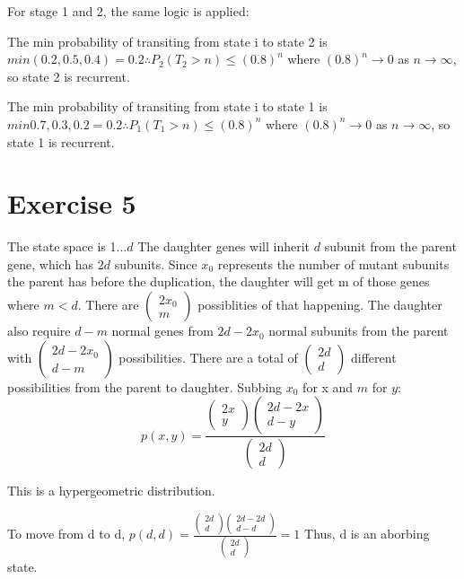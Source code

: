 \documentclass{article}\usepackage[]{graphicx}\usepackage[]{color}
\begin{document}
For stage 1 and 2, the same logic is applied:

The min probability of transiting from state i to state 2 is $min(0.2, 0.5,0.4)=0.2\therefore P_{2}(T_{2}>n)\leq (0.8)^{n}$ where
$(0.8)^{n} \rightarrow 0$ as $n \rightarrow \infty$, so state 2 is recurrent.

The min probability of transiting from state i to state 1 is $min{0.7, 0.3,0.2}=0.2\therefore P_{1}(T_{1}>n)\leq (0.8)^{n}$ where
$(0.8)^{n} \rightarrow 0$ as $n \rightarrow \infty$, so state 1 is recurrent.

\section*{Exercise 5}
The state space is {1...$d$}
The daughter genes will inherit $d$ subunit from the parent gene, which has $2d$ subunits. Since $x_{0}$ represents the number of mutant subunits the parent has before the duplication, the daughter will get m of those genes where $m<d$. There are $\left(\begin{array}{c}
2x_{0}\\
m
\end{array}\right)$ possiblities of that happening. The daughter also require $d-m$ normal genes from $2d-2x_{0}$ normal subunits from the parent with $\left(\begin{array}{c}
2d-2x_{0}\\
d-m
\end{array}\right)$ possibilities. There are a total of $\left(\begin{array}{c}
2d\\
d
\end{array}\right)$ different possibilities from the parent to daughter. Subbing $x_{0}$ for x and $m$ for $y$: 
\begin{equation}
p(x,y) = \frac{\left(\begin{array}{c}
2x\\
y
\end{array}\right)\left(\begin{array}{c}
2d-2x\\
d-y
\end{array}\right)}{\left(\begin{array}{c}
2d\\
d
\end{array}\right)}
\end{equation}

This is a hypergeometric distribution.

To move from d to d,
$p(d,d) = \frac{\left(\begin{array}{c}
2d\\
d
\end{array}\right)\left(\begin{array}{c}
2d-2d\\
d-d
\end{array}\right)}{\left(\begin{array}{c}
2d\\
d
\end{array}\right)} = 1$
Thus, d is an aborbing state.
\end{document}
